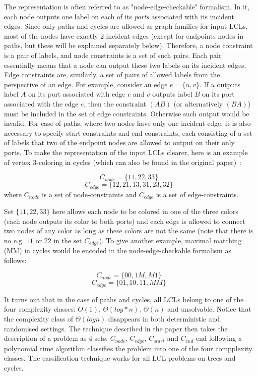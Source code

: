 The representation is often referred to as "node-edge-checkable" formalism.
In it, each node outputs one label on each of its \emph{ports} associated with
its incident edges. Since only paths and cycles are allowed as graph families for
input LCLs, most of the nodes have exactly 2 incident edges (except for endpoints nodes
in paths, but these will be explained separately below). Therefore, a node constraint
is a pair of labels, and node constraints is a set of such pairs. Each pair essentially
means that a node can output these two labels on its incident edges. Edge constraints are,
similarly, a set of pairs of allowed labels from the perspective of an edge. For example,
consider an edge $e = \{u, v\}$. If $u$ outputs label $A$ on its port associated with edge $e$
and $v$ outputs label $B$ on its port associated with the edge $e$, then the constraint $(AB)$
(or alternatively $(BA)$) must be included in the set of edge constraints. Otherwise such output
would be invalid. For case of paths, where two nodes have only one incident edge, it is also
necessary to specify start-constraints and end-constraints, each consisting of a set of labels
that two of the endpoint nodes are allowed to output on their only ports. To make the
representation of the input LCLs clearer, here is an example of vertex 3-coloring in cycles
(which can also be found in the original paper)~\cite{Chang2020}:

$$C_{node} = \{ 11, 22, 33 \}$$
$$C_{edge} = \{ 12, 21, 13, 31, 23, 32 \}$$
where $C_{node}$ is a set of node-constraints and $C_{edge}$ is a set of edge-constraints.

Set $\{ 11, 22, 33 \}$ here allows each node to be colored in one of the three colors
(each node outputs its color to both ports) and each edge is allowed to connect
two nodes of any color as long as these colors are not the same (note that there is no
e.g. $11$ or $22$ in the set $C_{edge}$). To give another example, maximal matching (MM) in cycles
would be encoded in the node-edge-checkable formalism as follows:

$$C_{node} = \{ 00, 1M, M1 \}$$
$$C_{edge} = \{ 01, 10, 11, MM \}$$

It turns out that in the case of paths and cycles, all LCLs belong to one of the four
complexity classes: $O(1)$, $\Theta(log* n)$, $\Theta(n)$ and unsolvable. Notice that
the complexity class of $\Theta(log n)$ disappears in both deterministic and randomised settings.
The technique described in the paper then takes the description of a problem as 4 sets: $C_{node}$,
$C_{edge}$, $C_{start}$ and $C_{end}$ end following a polynomial time algorithm classifies the
problem into one of the four compplexity classes. The cassification technique works for all LCL
problems on trees and cycles.


